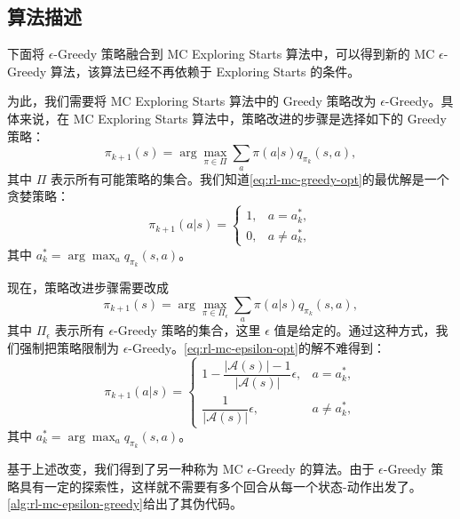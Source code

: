 \subsection{算法描述}
\label{sec:rl-mc-epsilon-greedy-algorithm}

下面将 $\epsilon$-Greedy 策略融合到 MC Exploring Starts 算法中，可以得到新的 MC $\epsilon$-Greedy 算法，该算法已经不再依赖于 Exploring Starts 的条件。

为此，我们需要将 MC Exploring Starts 算法中的 Greedy 策略改为 $\epsilon$-Greedy。具体来说，在 MC Exploring Starts 算法中，策略改进的步骤是选择如下的 Greedy 策略：
\begin{equation}
\label{eq:rl-mc-greedy-opt}
\pi_{k+1}(s) = \arg\max_{\pi \in \varPi} \sum_{a} \pi(a|s) q_{\pi_{k}}(s, a),
\end{equation}
其中 $\varPi$ 表示所有可能策略的集合。我们知道\cref{eq:rl-mc-greedy-opt}的最优解是一个贪婪策略：
\begin{equation}
\pi_{k+1}(a|s) = \begin{cases} 1, & a = a_{k}^{*}, \\ 0, & a \neq a_{k}^{*}, \end{cases}
\end{equation}
其中 $a_{k}^{*} = \arg\max_{a} q_{\pi_{k}}(s, a)$。

现在，策略改进步骤需要改成
\begin{equation}
\label{eq:rl-mc-epsilon-opt}
\pi_{k+1}(s) = \arg\max_{\pi \in \varPi_{\epsilon}} \sum_{a} \pi(a|s) q_{\pi_{k}}(s, a),
\end{equation}
其中 $\varPi_{\epsilon}$ 表示所有 $\epsilon$-Greedy 策略的集合，这里 $\epsilon$ 值是给定的。通过这种方式，我们强制把策略限制为 $\epsilon$-Greedy。\cref{eq:rl-mc-epsilon-opt}的解不难得到：
\begin{equation}
\pi_{k+1}(a|s) = \begin{cases}
1 - \dfrac{|\mathcal{A}(s)| - 1}{|\mathcal{A}(s)|}\epsilon, & a = a_{k}^{*}, \\[2ex]
\dfrac{1}{|\mathcal{A}(s)|}\epsilon, & a \neq a_{k}^{*},
\end{cases}
\end{equation}
其中 $a_{k}^{*} = \arg\max_{a} q_{\pi_{k}}(s, a)$。

基于上述改变，我们得到了另一种称为 MC $\epsilon$-Greedy 的算法。由于 $\epsilon$-Greedy 策略具有一定的探索性，这样就不需要有多个回合从每一个状态-动作出发了。\cref{alg:rl-mc-epsilon-greedy}给出了其伪代码。

